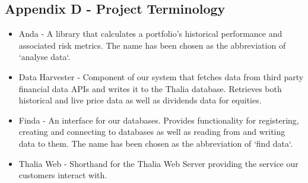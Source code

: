 \documentclass[main.tex]{subfiles}
\begin{document}
\subsection{Appendix D - Project Terminology}
\label{project_glossary}
\begin{itemize}
    \item Anda - A library that calculates a portfolio's historical performance and associated risk metrics. The name has been chosen as the abbreviation of `analyse data`.
    \item Data Harvester - Component of our system that fetches data from third party financial data APIs and writes it to the Thalia database. Retrieves both historical and live price data as well as dividends data for equities.
    \item Finda - An interface for our databases. Provides functionality for registering, creating and connecting to databases as well as reading from and writing data to them. The name has been chosen as the abbreviation of `find data`.
    \item Thalia Web - Shorthand for the Thalia Web Server providing the service our customers interact with.
\end{itemize}
\end{document}
